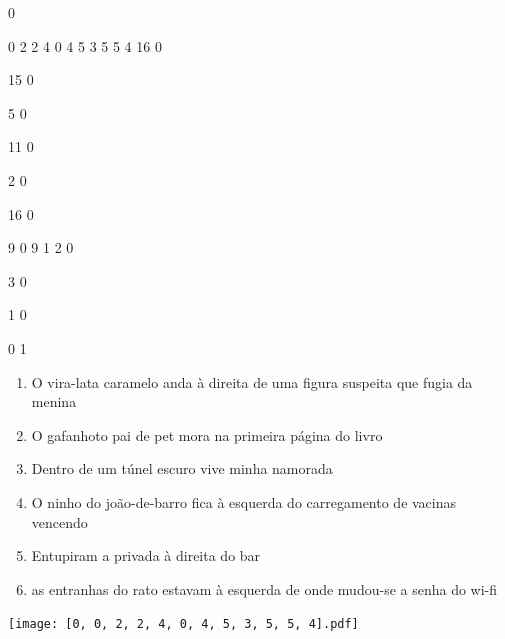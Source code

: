 \documentclass[12pt]{article}
\begin{document}
		\vfill  
		  
{
	0	%

	0	%
	2	%
	2	%
	4	%
	0	%
	4	%
	5	%
	3	%
	5	%
	5	%
	4	%
	16	%
	0	%

	15	%
	0	%

	5	%
	0	%

	11	%
	0	%

	2	%
	0	%

	16	%
	0	%

	9	%
	0	%
	9	%
	1	%
	2	%
	0	%

	3	%
	0	%

	1	%
	0	%

	0	%
	1	%
}	  
		    	

		 

\pagebreak


	\begin{enumerate}
		  \sffamily %
		  \large %


\vfill \item
O vira-lata caramelo anda	%
à direita
de uma figura suspeita que fugia da menina	%

\vfill \item
O gafanhoto pai de pet mora	%
na primeira página do livro	%

\vfill \item
Dentro de um túnel escuro	%
vive minha namorada	%

\vfill \item
O ninho do joão-de-barro fica	%
à esquerda
do carregamento de vacinas vencendo	%

\vfill \item
Entupiram a privada	%
à direita
do bar	%

\vfill \item
as entranhas do rato estavam	%
à esquerda
de onde mudou-se a senha do wi-fi	%
	\end{enumerate}
		  
		  \hfill

		  \vfill

\texttt{[image: [0, 0, 2, 2, 4, 0, 4, 5, 3, 5, 5, 4].pdf]}


	\hfill	  	  
\end{document}

